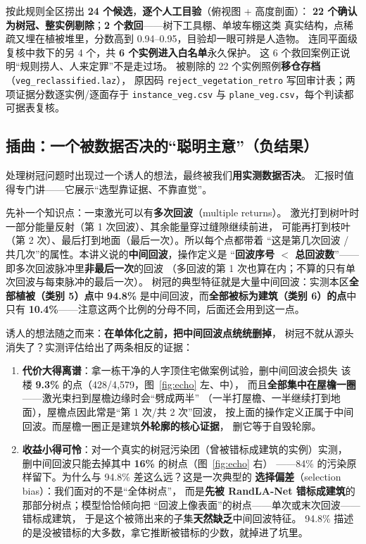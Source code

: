 按此规则全区捞出 \textbf{24 个候选}，\textbf{逐个人工目验}（俯视图 + 高度剖面）：
\textbf{22 个确认为树冠、整实例剔除}；\textbf{2 个救回}——树下工具棚、单坡车棚这类
真实结构，点稀疏又埋在植被堆里，分数高到 0.94--0.95，目验却一眼可辨是人造物。
连同平面级复核中救下的另 4 个，共 \textbf{6 个实例进入白名单}永久保护。
这 6 个救回案例正说明``规则捞人、人来定罪''不是走过场。
被剔除的 22 个实例照例\textbf{移仓存档}（\texttt{veg\_reclassified.laz}），
原因码 \texttt{reject\_vegetation\_retro} 写回审计表；两项证据分数逐实例/逐面存于
\texttt{instance\_veg.csv} 与 \texttt{plane\_veg.csv}，每个判读都可据表复核。

\subsection{插曲：一个被数据否决的``聪明主意''（负结果）}

处理树冠问题时出现过一个诱人的想法，最终被我们\textbf{用实测数据否决}。
汇报时值得专门讲——它展示``选型靠证据、不靠直觉''。

先补一个知识点：一束激光可以有\textbf{多次回波}（multiple returns）。
激光打到树叶时一部分能量反射（第 1 次回波）、其余能量穿过缝隙继续前进，
可能再打到枝叶（第 2 次）、最后打到地面（最后一次）。所以每个点都带着
``这是第几次回波 / 共几次''的属性。本讲义说的\textbf{中间回波}，操作定义是
``\textbf{回波序号 $<$ 总回波数}''——即多次回波脉冲里\textbf{非最后一次}的回波
（多回波的第 1 次也算在内；不算的只有单次回波与每束脉冲的最后一次）。
树冠的典型特征就是大量中间回波：实测本区\textbf{全部植被（类别 5）点}中
\textbf{94.8\%} 是中间回波，而\textbf{全部被标为建筑（类别 6）的点}中只有
\textbf{10.4\%}——注意这两个比例的分母不同，后面还会用到这一点。

诱人的想法随之而来：\textbf{在单体化之前，把中间回波点统统删掉}，
树冠不就从源头消失了？实测评估给出了两条相反的证据：

\begin{enumerate}
\item \textbf{代价大得离谱}：拿一栋干净的人字顶住宅做案例试验，删中间回波会损失
      该楼 \textbf{9.3\%} 的点（428/4{,}579，图~\ref{fig:echo} 左、中），
      而且\textbf{全部集中在屋檐一圈}——激光束扫到屋檐边缘时会``劈成两半''
      （一半打屋檐、一半继续打到地面），屋檐点因此常是``第 1 次/共 2 次''回波，
      按上面的操作定义正属于中间回波。而屋檐一圈正是建筑\textbf{外轮廓的核心证据}，
      删它等于自毁轮廓。
\item \textbf{收益小得可怜}：对一个真实的树冠污染团（曾被错标成建筑的实例）实测，
      删中间回波只能去掉其中 \textbf{16\%} 的树点（图~\ref{fig:echo} 右）
      ——84\% 的污染原样留下。为什么与 94.8\% 差这么远？这是一次典型的
      \textbf{选择偏差}（selection bias）：我们面对的不是``全体树点''，
      而是\textbf{先被 RandLA-Net 错标成建筑}的那部分树点；模型恰恰倾向把
      ``回波上像表面''的树点——单次或末次回波——错标成建筑，
      于是这个被筛出来的子集\textbf{天然缺乏}中间回波特征。
      94.8\% 描述的是没被错标的大多数，拿它推断被错标的少数，就掉进了坑里。
\end{enumerate}

